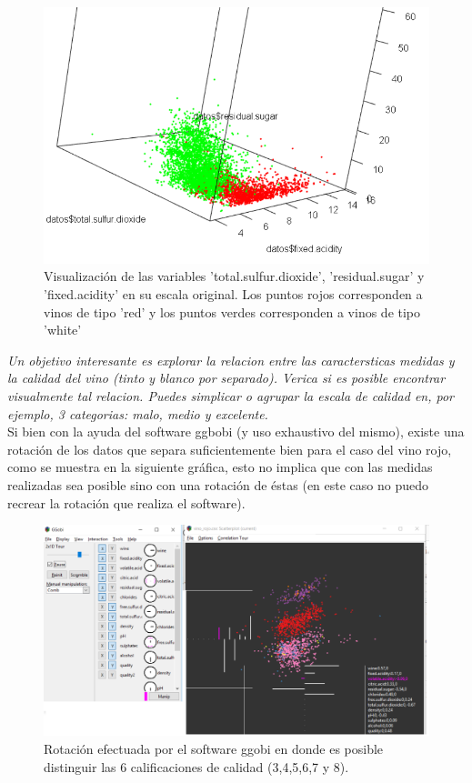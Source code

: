 \documentclass[paper=letter, fontsize=11pt]{scrartcl}
\numberwithin{equation}{section} %
\numberwithin{figure}{section} %
\numberwithin{table}{section} %
\begin{document}
\begin{figure}[htpb]
  \begin{center}
    \includegraphics[scale=.35]{seleccion2.png}
    \caption{Visualización de las variables 'total.sulfur.dioxide', 'residual.sugar' y 'fixed.acidity' en su escala original. Los puntos rojos corresponden a vinos de tipo 'red' y los puntos verdes corresponden a vinos de tipo 'white'}
    \label{fig:selec_vinos}
  \end{center}
\end{figure}
\newpage
\textit{Un objetivo interesante es explorar la relacion entre las caractersticas medidas y la calidad del vino (tinto y blanco por separado). Verica si es posible encontrar visualmente tal relacion. Puedes simplicar o agrupar la escala de calidad en, por ejemplo, 3 categorias: malo, medio y excelente.}\\
Si bien con la ayuda del software ggbobi (y uso exhaustivo del mismo), existe una rotación de los datos que separa suficientemente bien para el caso del vino rojo, como se muestra en la siguiente gráfica, esto no implica que con las medidas realizadas sea posible sino con una rotación de éstas (en este caso no puedo recrear la rotación que realiza el software).
\begin{figure}[htpb]
  \begin{center}
    \includegraphics[scale=.35]{separacion_vino_rojo.png}
    \caption{Rotación efectuada por el software ggobi en donde es posible distinguir las 6 calificaciones de calidad (3,4,5,6,7 y 8).}
    \label{fig:separacion_vinos}
  \end{center}
\end{figure}
\end{document}
